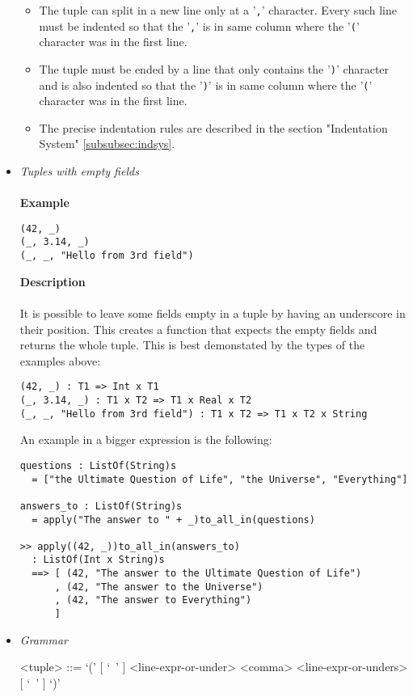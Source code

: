 \documentclass{article}
\begin{document}
\begin{itemize}
\begin{itemize}
\item
The tuple can split in a new line only at a '\verb|,|' character. Every such
line must be indented so that the '\verb|,|' is in same column where the
'\verb|(|' character was in the first line.

\item
The tuple must be ended by a line that only contains the '\verb|)|' character
and is also indented so that the '\verb|)|' is in same column where the
'\verb|(|' character was in the first line.

\item
The precise indentation rules are described in the section
"Indentation System" \ref{subsubsec:indsys}.
\end{itemize}

\item \textit{Tuples with empty fields}
\\\\
\textbf{Example}
\begin{verbatim}
(42, _)
(_, 3.14, _)
(_, _, "Hello from 3rd field")
\end{verbatim}

\textbf{Description}\\\\
It is possible to leave some fields empty in a tuple by having an underscore in
their position. This creates a function that expects the empty fields
and returns the whole tuple. This is best demonstated by the types of the
examples above:
\begin{verbatim}
(42, _) : T1 => Int x T1
(_, 3.14, _) : T1 x T2 => T1 x Real x T2
(_, _, "Hello from 3rd field") : T1 x T2 => T1 x T2 x String
\end{verbatim}
An example in a bigger expression is the following:
\begin{verbatim}
questions : ListOf(String)s
  = ["the Ultimate Question of Life", "the Universe", "Everything"]

answers_to : ListOf(String)s
  = apply("The answer to " + _)to_all_in(questions)

>> apply((42, _))to_all_in(answers_to)
  : ListOf(Int x String)s
  ==> [ (42, "The answer to the Ultimate Question of Life")
      , (42, "The answer to the Universe")
      , (42, "The answer to Everything")
      ]
\end{verbatim}

\item \textit{Grammar}
\begin{grammar}
<tuple> ::=
`(' [ `\ ' ] <line-expr-or-under> <comma> <line-expr-or-unders> [ `\ ' ] `)'


\end{grammar}
\end{itemize}
\end{document}
